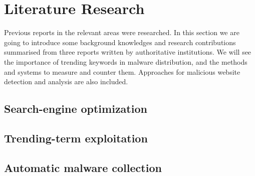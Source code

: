\documentclass[pdftex,a4paper,12pt]{article}
\begin{document}
\section*{Literature Research}
Previous reports in the relevant areas were researched. In this section we are going to introduce some background knowledges and research contributions summarised from three reports written by authoritative institutions. We will see the importance of trending keywords in malware distribution, and the methods and systems to measure and counter them. Approaches for malicious website detection and analysis are also included.

\subsection*{Search-engine optimization}


\subsection*{Trending-term exploitation}


\subsection*{Automatic malware collection}
\end{document}
